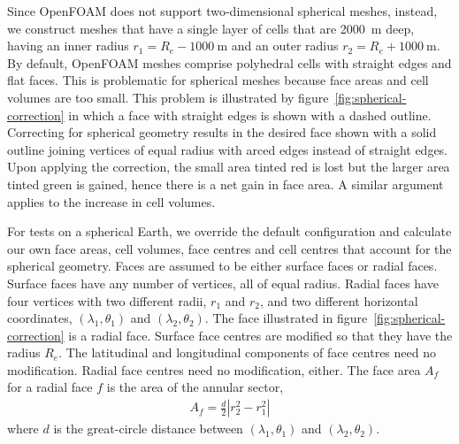 Since OpenFOAM does not support two-dimensional spherical meshes, instead, we construct meshes that have a single layer of cells that are \SI{2000}{\meter} deep, having an inner radius $r_1 = R_e - \SI{1000}{\meter}$ and an outer radius $r_2 = R_e + \SI{1000}{\meter}$.
By default, OpenFOAM meshes comprise polyhedral cells with straight edges and flat faces.  This is problematic for spherical meshes because face areas and cell volumes are too small.  This problem is illustrated by figure~\ref{fig:spherical-correction} in which a face with straight edges is shown with a dashed outline.
Correcting for spherical geometry results in the desired face shown with a solid outline joining vertices of equal radius with arced edges instead of straight edges.  Upon applying the correction, the small area tinted red is lost but the larger area tinted green is gained, hence there is a net gain in face area.  A similar argument applies to the increase in cell volumes.

For tests on a spherical Earth, we override the default configuration and calculate our own face areas, cell volumes, face centres and cell centres that account for the spherical geometry.  
Faces are assumed to be either surface faces or radial faces.  Surface faces have any number of vertices, all of equal radius.  Radial faces have four vertices with two different radii, $r_1$ and $r_2$, and two different horizontal coordinates, $(\lambda_1, \theta_1)$ and $(\lambda_2, \theta_2)$.  The face illustrated in figure~\ref{fig:spherical-correction} is a radial face.
Surface face centres are modified so that they have the radius $R_e$.  The latitudinal and longitudinal components of face centres need no modification.  Radial face centres need no modification, either.
The face area $A_f$ for a radial face $f$ is the area of the annular sector,
\begin{align}
	A_f = \frac{d}{2} \left\lvert r_2^2 - r_1^2 \right\rvert
\end{align}
where $d$ is the great-circle distance between $(\lambda_1, \theta_1)$ and $(\lambda_2, \theta_2)$.

